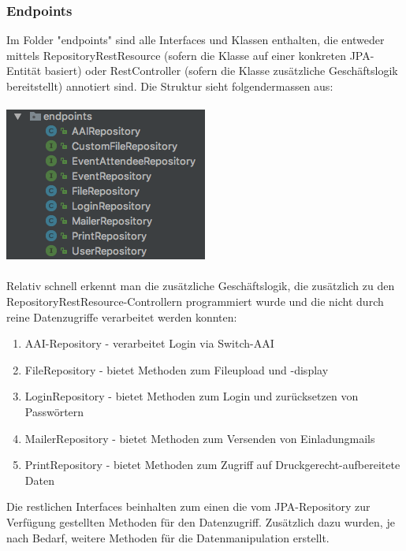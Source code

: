 \documentclass[11pt]{article} %
\begin{document}
\subsubsection{Endpoints}
Im Folder "endpoints" sind alle Interfaces und Klassen enthalten, die entweder mittels RepositoryRestResource (sofern die Klasse auf einer konkreten JPA-Entität basiert) oder RestController (sofern die Klasse zusätzliche Geschäftslogik bereitstellt) annotiert sind. Die Struktur sieht folgendermassen aus:
\\
\\
\includegraphics[scale=0.7]{structure_eventmanagement_endpoints}
\\
\\
Relativ schnell erkennt man die zusätzliche Geschäftslogik, die zusätzlich zu den RepositoryRestResource-Controllern programmiert wurde und die nicht durch reine Datenzugriffe verarbeitet werden konnten:
\begin{enumerate}
\item AAI-Repository - verarbeitet Login via Switch-AAI
\item FileRepository - bietet Methoden zum Fileupload und -display
\item LoginRepository - bietet Methoden zum Login und zurücksetzen von Passwörtern
\item MailerRepository - bietet Methoden zum Versenden von Einladungmails
\item PrintRepository - bietet Methoden zum Zugriff auf Druckgerecht-aufbereitete Daten
\end{enumerate}
Die restlichen Interfaces beinhalten zum einen die vom JPA-Repository zur Verfügung gestellten Methoden für den Datenzugriff. Zusätzlich dazu wurden, je nach Bedarf, weitere Methoden für die Datenmanipulation erstellt.
\end{document}

